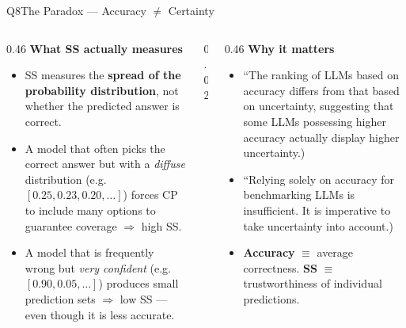 \documentclass[aspectratio=169,10pt]{beamer}
\newcommand{\hruleslide}{%
  \vspace{0.15em}{\color{Rule}\hrule height 0.4pt}\vspace{0.3em}}
\begin{document}
\begin{frame}{Q8\enspace The Paradox — Accuracy $\neq$ Certainty}

\vspace{0.15em}

\vspace{0.45em}
\begin{columns}[T]
  \begin{column}{0.46\textwidth}
    {\small\bfseries\color{darkred}What SS actually measures}
    \hruleslide
    \begin{itemize}\setlength\itemsep{5pt}\footnotesize
      \item SS measures the \textbf{spread of the probability distribution}, not whether the predicted answer is correct.
      \item A model that often picks the correct answer but with a \emph{diffuse} distribution (e.g.\ $[0.25,0.23,0.20,\ldots]$) forces CP to include many options to guarantee coverage $\Rightarrow$ high SS.
      \item A model that is frequently wrong but \emph{very confident} (e.g.\ $[0.90,0.05,\ldots]$) produces small prediction sets $\Rightarrow$ low SS — even though it is less accurate.
    \end{itemize}
  \end{column}

  \begin{column}{0.02\textwidth}\color{Rule}\vrule\end{column}

  \begin{column}{0.46\textwidth}
    {\small\bfseries\color{darkred}Why it matters}
    \hruleslide
    \begin{itemize}\setlength\itemsep{5pt}\footnotesize
      \item ``The ranking of LLMs based on accuracy differs from that based on uncertainty, suggesting that some LLMs possessing higher accuracy actually display higher uncertainty.)
      \item ``Relying solely on accuracy for benchmarking LLMs is insufficient. It is imperative to take uncertainty into account.)
      \item \textbf{Accuracy} $\equiv$ average correctness.
        \textbf{SS} $\equiv$ trustworthiness of individual predictions.
    \end{itemize}
  \end{column}
\end{columns}
\end{frame}

\end{document}
